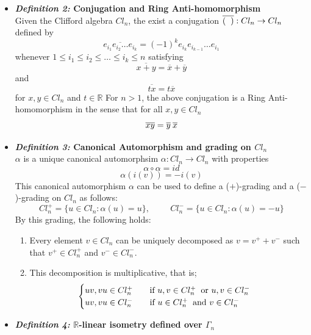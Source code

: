 \documentclass[12pt,onecolumn,letterpaper]{article} %
\begin{document}
\begin{itemize}
\item  \textbf{\emph{Definition 2:} Conjugation and Ring Anti-homomorphism}\\
Given the Clifford algebra $Cl_n$, the exist a conjugation $\overline{(\hspace{.2cm} )} : Cl_n\to Cl_n$ defined by
$$\overline{e_{i_1}e_{i_2}\dots e_{i_k}}=(-1)^ke_{i_k}e_{i_{k-1}}\dots e_{i_1}$$
whenever $1\le i_1\le i_2\le \dots \le i_k\le n$ satisfying
$$\overline{x+y}=\overline{x}+\overline{y}$$ and 
$$\overline{tx}=t\overline{x}$$
for $x,y\in Cl_n$ and $t\in \mathbb{R}$
For $n>1$, the above conjugation is a Ring Anti-homomorphism in the sense that for all $x,y\in Cl_n$
\begin{equation}
    \overline{xy}=\overline{y}\hspace{.08cm}\overline{x}\label{conjugate}
\end{equation}
\item  \textbf{\emph{Definition 3:} Canonical Automorphism and grading on $Cl_n$}\\
$\alpha$ is a unique canonical automorphsim $\alpha : Cl_n \to Cl_n$ with properties
$$\alpha\circ \alpha=id$$
$$\alpha(i(v))=-i(v)$$
This canonical automorphism $\alpha$ can be used to define a ($+$)-grading and a ($-$)-grading on $Cl_n$ as follows: 
$$Cl_n^{+}=\{u\in Cl_n : \alpha(u)=u\},\hspace{1cm}Cl_n^{-}=\{u\in Cl_n : \alpha(u)=-u\}$$
By this grading, the following holds:
\begin{enumerate}[label=\roman*.]
\item Every element $v \in Cl_n$ can be uniquely decomposed as $v=v^++v^-$ such that $v^+\in Cl_n^{+}$ and $v^-\in Cl_n^{-}$.
\item This decomposition is multiplicative, that is; 
\begin{equation}
       \begin{cases} 
      uv,vu\in Cl_n^{+} \hspace{.7cm}{\mbox{if  }} u,v\in Cl_n^{+} \hspace{.2cm}{\mbox{or  }} u,v \in Cl_n^{-} \\
      uv,vu\in Cl_n^{-} \hspace{.7cm}{\mbox{if  }} u\in Cl_n^{+} \hspace{.2cm}{\mbox{and  }} v \in Cl_n^{-}\label{decompose}
   \end{cases}
   \end{equation}
\end{enumerate}
\item  \textbf{\emph{Definition 4:} $\mathbb{R}$-linear isometry defined over  $\Gamma_n$}\\

\end{itemize}
\end{document}
